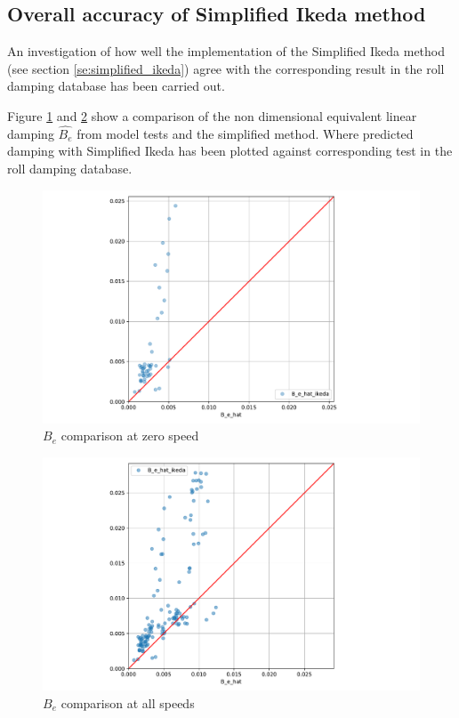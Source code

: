 \subsection{Overall accuracy of Simplified Ikeda method}
\label{se:overall_comparison}
An investigation of how well the implementation of the Simplified Ikeda method (see section \ref{se:simplified_ikeda}) agree with the corresponding result in the roll damping database has been carried out.

Figure \ref{fig:B_e_hat_ikeda_zero} and \ref{fig:B_e_hat_ikeda} show a comparison of the non dimensional equivalent linear damping $\hat{B_e}$
from model tests and the simplified method. Where predicted damping with Simplified Ikeda has been plotted against corresponding test in the roll damping database.  

\begin{figure}[H]
    \centering
    \includegraphics[width=0.9\columnwidth]{figures/B_e_hat_ikeda_zero.pdf}
    \caption{$\hat{B_e}$ comparison at zero speed}
    \label{fig:B_e_hat_ikeda_zero}
\end{figure}

\begin{figure}[H]
    \centering
    \includegraphics[width=0.9\columnwidth]{figures/B_e_hat_ikeda.pdf}
    \caption{$\hat{B_e}$ comparison at all speeds}
    \label{fig:B_e_hat_ikeda}
\end{figure}

